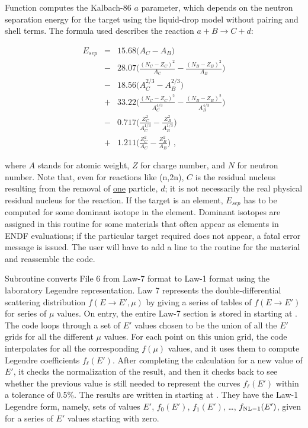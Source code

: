Function 
computes the Kalbach-86 $a$ parameter, which depends
on the neutron separation energy for the target  using the
liquid-drop model without pairing and shell terms.  The formula
used describes the reaction $a+B\rightarrow C+d$:

\begin{eqnarray}
   E_{sep} & = & 15.68\bigl(A_C-A_B\bigr) \nonumber\\
           & - & 28.07\bigl(\frac{(N_C-Z_C)^2}{A_C}
                 -\frac{(N_B-Z_B)^2}{A_B}\bigr) \nonumber\\
           & - & 18.56\bigl(A_C^{2/3}-A_B^{2/3}\bigr) \nonumber\\
           & + & 33.22\bigl(\frac{(N_C-Z_C)^2}{A_C^{4/3}}
                 -\frac{(N_B-Z_B)^2}{A_B^{4/3}}\bigr) \nonumber\\
           & - & 0.717\bigl(\frac{Z_C^2}{A_C^{1/3}}
                 -\frac{Z_B^2}{A_B^{1/3}}\bigr) \nonumber\\
           & + & 1.211\bigl(\frac{Z_C^2}{A_C}
                 -\frac{Z_B^2}{A_B}\bigr) \,\,,
\end{eqnarray}

\noindent
where $A$ stands for atomic weight, $Z$ for charge number, and
$N$ for neutron number.  Note that, even for reactions like (n,2n),
$C$ is the residual nucleus resulting from the removal of
\underline{one} particle, $d$; it is not necessarily the real
physical residual nucleus for the reaction.  If the target 
is an element, $E_{sep}$ has to be computed for some dominant isotope
in the element.  Dominant isotopes are assigned in this routine for
some materials that often appear as elements in ENDF evaluations; if
the particular target required does not appear, a fatal error message
is issued.  The user will have to add a line to the routine for the
material and reassemble the code.

Subroutine  converts File 6
from Law-7 format to Law-1 format using the laboratory Legendre
representation.  Law 7 represents the double-differential scattering
distribution $f(E{\rightarrow}E',\mu)$ by giving a series of tables of
$f(E{\rightarrow}E')$ for series of $\mu$ values.  On entry, the entire
Law-7 section is stored in  starting at .  The code
loops through a set of $E'$ values chosen to be the union of all the
$E'$ grids for all the different $\mu$ values.  For each point on this
union grid, the code interpolates for all the corresponding $f(\mu)$
values, and it uses them to compute  Legendre coefficients
$f_\ell(E')$.  After completing the calculation for a new value of $E'$,
it checks the normalization of the result, and then it checks back to see
whether the previous value is still needed to represent the curves
$f_\ell(E')$ within a tolerance of 0.5\%.
The results are written in  starting at .  They
have the Law-1 Legendre form, namely, sets of values $E'$, $f_0(E')$,
$f_1(E')$, \ldots, $f_{{\rm NL}-1}(E')$, given for a series of $E'$
values starting with zero.

